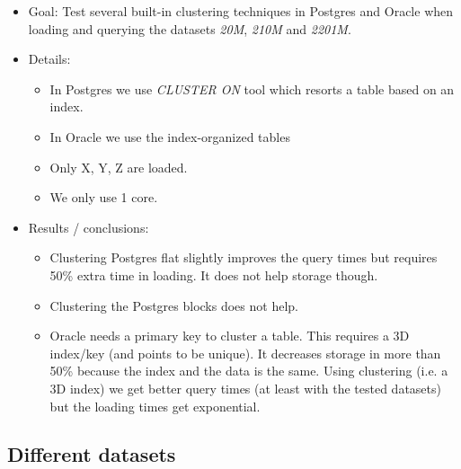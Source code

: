 \documentclass[a4paper,11pt]{article}
\begin{document}
\begin{itemize}
	\item Goal: 	Test several built-in clustering techniques in Postgres and Oracle when loading and querying the datasets \textit{20M}, \textit{210M} and \textit{2201M}.
	\item Details: 
	\begin{itemize}
		\item In Postgres we use \textit{CLUSTER ON} tool which resorts a table based on an index.
		\item In Oracle we use the index-organized tables
		\item Only X, Y, Z are loaded.
		\item We only use 1 core.
	\end{itemize}				
	\item Results / conclusions: 
	\begin{itemize}
		\item Clustering Postgres flat slightly improves the query times  but requires 50\% extra time in loading. It does not help storage though.
		\item Clustering the Postgres blocks does not help.
		\item Oracle needs a primary key to cluster a table. This requires a 3D index/key (and points to be unique). It decreases storage in more than 50\% because the index and the data is the same. Using clustering (i.e. a 3D index) we get better query times (at least with the tested datasets) but the loading times get exponential.
	\end{itemize}			
\end{itemize}

\subsection{Different datasets}
\end{document}
